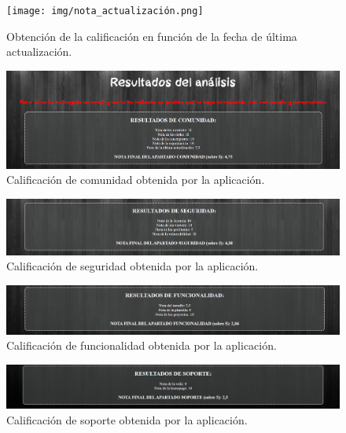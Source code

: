\documentclass[a4paper, 12pt]{book}
\begin{document}
\begin{figure}
    \centering
    \texttt{[image: img/nota\_actualización.png]}
    \caption{Obtención de la calificación en función de la fecha de última actualización.}\label{fig:nota_actualización}
\end{figure}

\begin{figure}
    \centering
    \includegraphics[width=1\textwidth, keepaspectratio]{img/test_comunidad.png}
    \caption{Calificación de comunidad obtenida por la aplicación.}\label{fig:test_comunidad}
\end{figure}

\begin{figure}
    \centering
    \includegraphics[width=1\textwidth, keepaspectratio]{img/test_seguridad.png}
    \caption{Calificación de seguridad obtenida por la aplicación.}\label{fig:test_seguridad}
\end{figure}

\begin{figure}
    \centering
    \includegraphics[width=1\textwidth, keepaspectratio]{img/test_funcionalidad.png}
    \caption{Calificación de funcionalidad obtenida por la aplicación.}\label{fig:test_funcionalidad}
\end{figure}

\begin{figure}
    \centering
    \includegraphics[width=1\textwidth, keepaspectratio]{img/test_soporte.png}
    \caption{Calificación de soporte obtenida por la aplicación.}\label{fig:test_soporte}
\end{figure}
\end{document}
